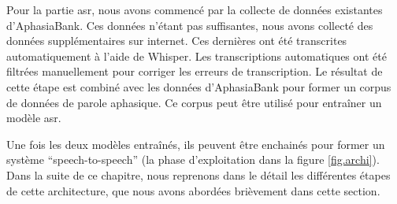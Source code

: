 Pour la partie \gls{asr}, nous avons commencé par la collecte de données existantes d'AphasiaBank.
Ces données n'étant pas suffisantes, nous avons collecté des données supplémentaires sur internet.
Ces dernières ont été transcrites automatiquement à l'aide de \foreignlanguage{english}{Whisper}.
Les transcriptions automatiques ont été filtrées manuellement pour corriger les erreurs de transcription.
Le résultat de cette étape est combiné avec les données d'AphasiaBank 
pour former un corpus de données de parole aphasique.
Ce corpus peut être utilisé pour entraîner un modèle \gls{asr}.

Une fois les deux modèles entraînés,
ils peuvent être enchainés pour former un système ``\foreignlanguage{english}{speech-to-speech}''
(la phase d'exploitation dans la figure \ref{fig.archi}).
Dans la suite de ce chapitre, 
nous reprenons dans le détail les différentes étapes de cette architecture, 
que nous avons abordées brièvement dans cette section.
